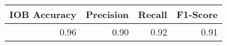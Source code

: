 \begin{tabular}{rrrr}
\toprule
 IOB Accuracy &  Precision &  Recall &  F1-Score \\
\midrule
         0.96 &       0.90 &    0.92 &      0.91 \\
\bottomrule
\end{tabular}
